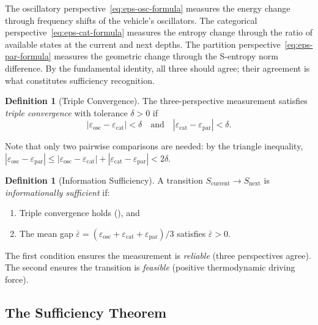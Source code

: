 \documentclass[twocolumn,10pt]{article}
\theoremstyle{definition}
\newtheorem{definition}[theorem]{Definition}
\newcommand{\Scurrent}{S_{\mathrm{current}}}
\newcommand{\Snext}{S_{\mathrm{next}}}
\begin{document}
The oscillatory perspective~\eqref{eq:eps-osc-formula} measures the energy change through frequency shifts of the vehicle's oscillators. The categorical perspective~\eqref{eq:eps-cat-formula} measures the entropy change through the ratio of available states at the current and next depths. The partition perspective~\eqref{eq:eps-par-formula} measures the geometric change through the S-entropy norm difference. By the fundamental identity, all three should agree; their agreement is what constitutes sufficiency recognition.

\begin{definition}[Triple Convergence]
\label{def:triple-convergence}
The three-perspective measurement satisfies \emph{triple convergence} with tolerance $\delta > 0$ if
\begin{equation}
|\varepsilon_{\mathrm{osc}} - \varepsilon_{\mathrm{cat}}| < \delta \quad \text{and} \quad |\varepsilon_{\mathrm{cat}} - \varepsilon_{\mathrm{par}}| < \delta.
\label{eq:triple-convergence}
\end{equation}
\end{definition}

Note that only two pairwise comparisons are needed: by the triangle inequality, $|\varepsilon_{\mathrm{osc}} - \varepsilon_{\mathrm{par}}| \leq |\varepsilon_{\mathrm{osc}} - \varepsilon_{\mathrm{cat}}| + |\varepsilon_{\mathrm{cat}} - \varepsilon_{\mathrm{par}}| < 2\delta$.

\begin{definition}[Information Sufficiency]
\label{def:info-sufficiency}
A transition $\Scurrent \to \Snext$ is \emph{informationally sufficient} if:
\begin{enumerate}[leftmargin=*]
\item Triple convergence holds (), and
\item The mean gap $\bar{\varepsilon} = (\varepsilon_{\mathrm{osc}} + \varepsilon_{\mathrm{cat}} + \varepsilon_{\mathrm{par}})/3$ satisfies $\bar{\varepsilon} > 0$.
\end{enumerate}
The first condition ensures the measurement is \emph{reliable} (three perspectives agree). The second ensures the transition is \emph{feasible} (positive thermodynamic driving force).
\end{definition}

\subsection{The Sufficiency Theorem}
\end{document}
